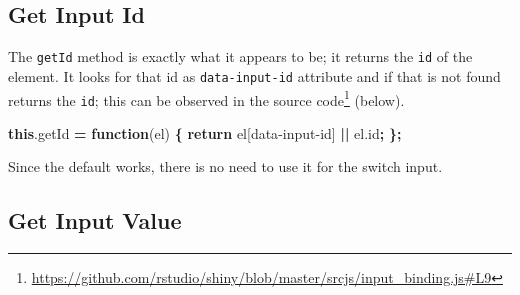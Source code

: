 \documentclass[
]{krantz}
\makeatletter
\newenvironment{Shaded}{\begin{snugshade}}{\end{snugshade}}
\newcommand{\AttributeTok}[1]{\textcolor[rgb]{0.61,0.61,0.61}{#1}}
\newcommand{\CommentTok}[1]{\textcolor[rgb]{0.37,0.37,0.37}{\textit{#1}}}
\newcommand{\ControlFlowTok}[1]{\textcolor[rgb]{0.27,0.27,0.27}{\textbf{#1}}}
\newcommand{\DataTypeTok}[1]{\textcolor[rgb]{0.27,0.27,0.27}{#1}}
\newcommand{\KeywordTok}[1]{\textcolor[rgb]{0.27,0.27,0.27}{\textbf{#1}}}
\newcommand{\NormalTok}[1]{#1}
\newcommand{\OperatorTok}[1]{\textcolor[rgb]{0.43,0.43,0.43}{\textbf{#1}}}
\newcommand{\StringTok}[1]{\textcolor[rgb]{0.5,0.5,0.5}{#1}}
\newcommand{\VariableTok}[1]{\textcolor[rgb]{0,0,0}{#1}}
\renewcommand{\href}[2]{#2\footnote{\url{#1}}}
\newenvironment{kframe}{%
\medskip{}
\setlength{\fboxsep}{.8em}
 \def\at@end@of@kframe{}%
 \ifinner\ifhmode%
  \def\at@end@of@kframe{\end{minipage}}%
  \begin{minipage}{\columnwidth}%
 \fi\fi%
 \def\FrameCommand##1{\hskip\@totalleftmargin \hskip-\fboxsep
 \colorbox{shadecolor}{##1}\hskip-\fboxsep
     \hskip-\linewidth \hskip-\@totalleftmargin \hskip\columnwidth}%
 \MakeFramed {\advance\hsize-\width
   \@totalleftmargin\z@ \linewidth\hsize
   \@setminipage}}%
 {\par\unskip\endMakeFramed%
 \at@end@of@kframe}
\renewenvironment{Shaded}{\begin{kframe}}{\end{kframe}}
\makeatother
\begin{document}
\begin{Shaded}
\end{Shaded}

\hypertarget{shiny-input-get-id}{%
\subsection{Get Input Id}\label{shiny-input-get-id}}

The \texttt{getId} method is exactly what it appears to be; it returns the \texttt{id} of the element. It looks for that id as \texttt{data-input-id} attribute and if that is not found returns the \texttt{id}; this can be observed in the \href{https://github.com/rstudio/shiny/blob/master/srcjs/input_binding.js\#L9}{source code} (below).

\begin{Shaded}
\begin{Highlighting}[]
\KeywordTok{this}\NormalTok{.}\AttributeTok{getId} \OperatorTok{=} \KeywordTok{function}\NormalTok{(el) }\OperatorTok{\{}
  \ControlFlowTok{return}\NormalTok{ el[}\StringTok{\textquotesingle{}data{-}input{-}id\textquotesingle{}}\NormalTok{] }\OperatorTok{||} \VariableTok{el}\NormalTok{.}\AttributeTok{id}\OperatorTok{;}
\OperatorTok{\};}
\end{Highlighting}
\end{Shaded}

Since the default works, there is no need to use it for the switch input.

\hypertarget{shiny-input-get-value}{%
\subsection{Get Input Value}\label{shiny-input-get-value}}
\end{document}
